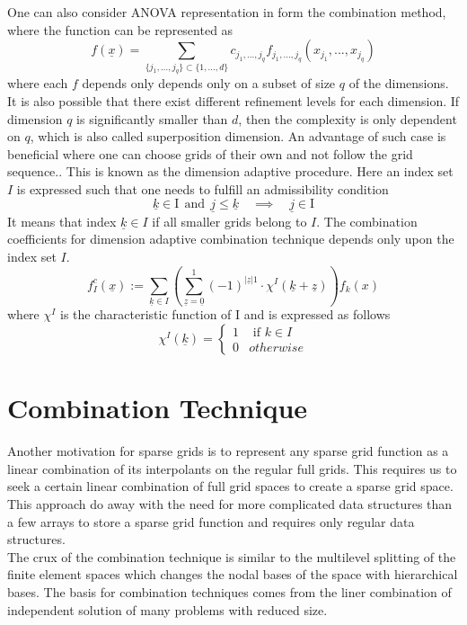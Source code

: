 One can also consider ANOVA representation in form the combination method, where the function can be represented as
\begin{equation}
	f(\underline{x}) = \sum_{\{j_1,...,j_q\}\subset\{1,...,d\}} c_{j_1,...,j_q} f_{j_1,...,j_q} \left( x_{j_1},...,x_{j_q} \right)
\end{equation}
where each $f$ depends only depends only on a subset of size $q$ of the dimensions. It is also possible that there exist different refinement levels for each dimension. If dimension $q$ is significantly smaller than $d$, then the complexity is only dependent on $q$, which is also called superposition dimension. An advantage of such case is beneficial where one can choose grids of their own and not follow the grid sequence.. This is known as the dimension adaptive procedure. Here an index set $I$ is expressed such that one needs to fulfill an admissibility condition
\begin{equation}
	\underline{k} \in \text{I} \ \ \text{and} \ \ \underline{j}\le \underline{k} \quad \implies \quad \underline{j}\in \text{I}
\end{equation}
It means that index $\underline{k} \in I$ if all smaller grids belong to $I$. The combination coefficients for dimension adaptive combination technique depends only upon the index set $I$. 
\begin{equation}
    f_I^c\left(\underline{x}\right) := \sum\limits_{\underline{k} \in I}\left( \sum\limits_{\underline{z} = \underline{0}}^{1}\left(-1\right)^{\left|\underline{z}\right|1}\cdot \chi^{I}\left(\underline{k}+\underline{z}\right)\right)f_{k}\left(x\right)
\end{equation}
where $\chi^{I}$ is the characteristic function of I and is expressed as follows
\begin{equation}
     \chi^{I}(\underline{k}) =
     \begin{cases}
        1 &  \text{ if } k \in I\\
        0 & otherwise 
     \end{cases}
\end{equation}

\section{Combination Technique}
Another motivation for sparse grids is to represent any sparse grid function as a linear combination of its interpolants on the regular full grids. This requires us to seek a certain linear combination of full grid spaces to create a sparse grid space. This approach do away with the need for more complicated data structures than a few arrays to store a sparse grid function and requires only regular data structures.\cite{Griebel1992b} \\
The crux of the combination technique is similar to the multilevel splitting of the finite element spaces which changes the nodal bases of the space with hierarchical bases. \cite{Yserentant1986}
The basis for combination techniques comes from the liner combination of independent solution of many problems with reduced size. \cite{Griebel1992}\\

